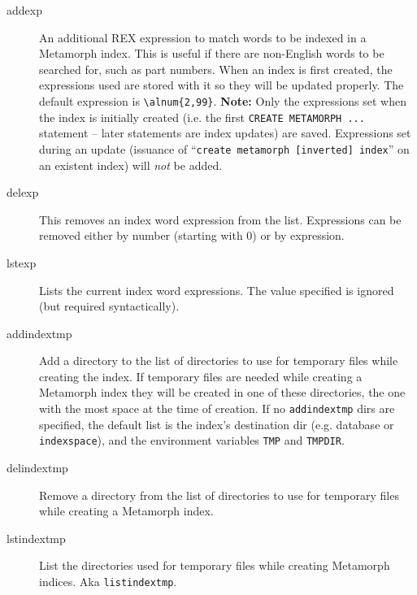 \begin{description}
\item[addexp] An additional REX expression to match words to be
\label{addexpSqlProperty}
  indexed in a Metamorph index.  This is useful if there are
  non-English words to be searched for, such as part numbers.  When an
  index is first created, the expressions used are stored with it so
  they will be updated properly.  The default expression is
  \verb`\alnum{2,99}`.  {\bf Note:} Only the expressions set when the
  index is initially created (i.e. the first {\tt CREATE METAMORPH
  ...} statement -- later statements are index updates) are saved.
  Expressions set during an update (issuance of ``{\tt create
  metamorph [inverted] index}'' on an existent index) will {\em not}
  be added.

\item[delexp] This removes an index word expression from the list.
Expressions can be removed either by number (starting with 0) or by
expression.

\item[lstexp] Lists the current index word expressions.  The
value specified is ignored (but required syntactically).

\item[addindextmp] Add a directory to the list of directories to use
for temporary files while creating the index.  If temporary files are
needed while creating a Metamorph index they will be created in one of
these directories, the one with the most space at the time of
creation.  If no \verb|addindextmp| dirs are specified, the default
list is the index's destination dir (e.g. database or \verb|indexspace|),
and the environment variables \verb|TMP| and \verb|TMPDIR|.

\item[delindextmp]  Remove a directory from the list of directories to
use for temporary files while creating a Metamorph index.

\item[lstindextmp]  List the directories used for temporary files while
creating Metamorph indices.  Aka \verb`listindextmp`.




\end{description}
